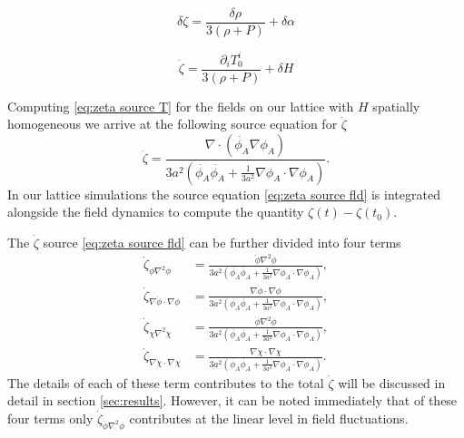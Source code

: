 
\begin{equation} \label{eq:zeta differential}
  \delta\zeta = \frac{\delta\rho}{3(\rho + P)} + \delta\alpha
\end{equation} 

\begin{equation} \label{eq:zeta source T}
  \dot{\zeta} = \frac{\partial_iT^i_0}{3(\rho+P)} + \delta H %
\end{equation} 

Computing \eqref{eq:zeta source T} for the fields on our lattice with $H$ spatially homogeneous we arrive at the following source equation for $\dot{\zeta}$
\begin{equation} \label{eq:zeta source fld}
  \dot{\zeta} = \frac{\nabla\cdot(\dot{\phi_A}\nabla\phi_A)}{3a^2(\dot{\phi_A}\dot{\phi_A} +\frac{1}{3a^2}\nabla\phi_A\cdot\nabla\phi_A)}.
\end{equation} 
In our lattice simulations the source equation \eqref{eq:zeta source fld} is integrated alongside the field dynamics to compute the quantity $\zeta(t) - \zeta(t_0)$. 

The $\dot{\zeta}$ source \eqref{eq:zeta source fld} can be further divided into four terms
\begin{align}
  \dot{\zeta}_{\dot{\phi}\nabla^2\phi} & = \frac{\dot{\phi}\nabla^2\phi}{3a^2(\dot{\phi_A}\dot{\phi_A} +\frac{1}{3a^2}\nabla\phi_A\cdot\nabla\phi_A)}, \\
  \dot{\zeta}_{\nabla\dot{\phi}\cdot\nabla\phi} & = \frac{\nabla\dot{\phi}\cdot\nabla\phi}{3a^2(\dot{\phi_A}\dot{\phi_A} +\frac{1}{3a^2}\nabla\phi_A\cdot\nabla\phi_A)}, \\
  \dot{\zeta}_{\dot{\chi}\nabla^2\chi} & = \frac{\dot{\phi}\nabla^2\phi}{3a^2(\dot{\phi_A}\dot{\phi_A} +\frac{1}{3a^2}\nabla\phi_A\cdot\nabla\phi_A)}, \\
  \dot{\zeta}_{\nabla\dot{\chi}\cdot\nabla\chi} & = \frac{\nabla\dot{\chi}\cdot\nabla\chi}{3a^2(\dot{\phi_A}\dot{\phi_A} +\frac{1}{3a^2}\nabla\phi_A\cdot\nabla\phi_A)}.
\end{align}
The details of each of these term contributes to the total $\dot{\zeta}$ will be discussed in detail in section \ref{sec:results}.
However, it can be noted immediately that of these four terms only $\dot{\zeta}_{\dot{\phi}\nabla^2\phi}$ contributes at the linear level in field fluctuations. %

